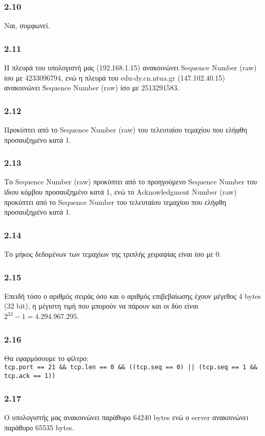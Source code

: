 		\subsubsection*{2.10} 
			Ναι, συμφωνεί.
		
		\subsubsection*{2.11} 
			Η πλευρά του υπολογιστή μας (192.168.1.15) ανακοινώνει Sequence Number (raw) ίσο με 4233096794, ενώ η πλευρά του edu-dy.cn.ntua.gr (147.102.40.15) ανακοινώνει Sequence Number (raw) ίσο με 2513291583.
		
		\subsubsection*{2.12} 
			Προκύπτει από το Sequence Number (raw) του τελευταίου τεμαχίου που ελήφθη προσαυξημένο κατά 1.
			
		\subsubsection*{2.13} 
			Το Sequence Number (raw) προκύπτει από το προηγούμενο Sequence Number του ίδιου κόμβου προσαυξημένο κατά 1, ενώ το Acknowledgment Number (raw) προκύπτει από το Sequence Number του τελευταίου τεμαχίου που ελήφθη προσαυξημένο κατά 1.
		
		\subsubsection*{2.14} 
			Το μήκος δεδομένων των τεμαχίων της τριπλής χειραψίας είναι ίσο με 0.
		
		\subsubsection*{2.15} 
			Επειδή τόσο ο αριθμός σειράς όσο και ο αριθμός επιβεβαίωσης έχουν μέγεθος 4 bytes (32 bit), η μέγιστη τιμή που μπορούν να πάρουν και οι δύο είναι $2^{32}-1=4.294.967.295$.
			
		\subsubsection*{2.16} 
			Θα εφαρμόσουμε το φίλτρο: \\
			\verb+tcp.port == 21 && tcp.len == 0 && ((tcp.seq == 0) || (tcp.seq == 1 && tcp.ack == 1))+
			
		\subsubsection*{2.17} 
			Ο υπολογιστής μας ανακοινώνει παράθυρο 64240 bytes ενώ ο server ανακοινώνει παράθυρο 65535 bytes.
		
